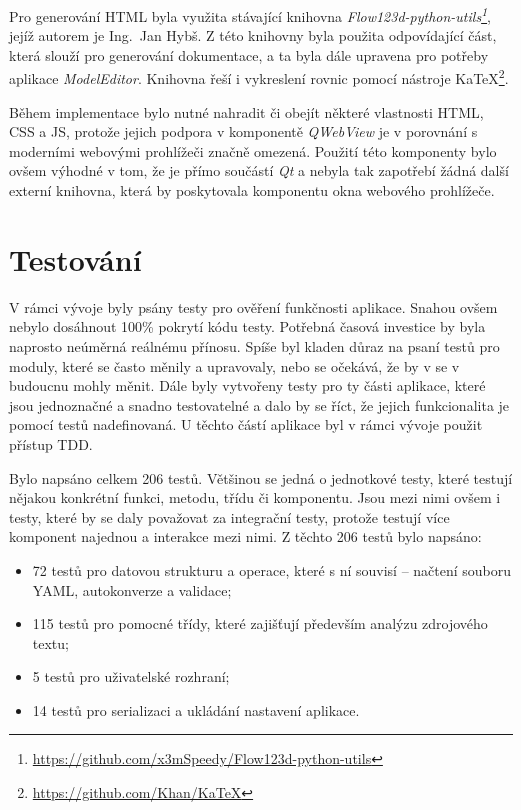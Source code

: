 \documentclass[FM,bw,DP]{tulthesis}
\begin{document}
Pro generování HTML byla využita stávající knihovna \textit{Flow123d-python-utils\footnote{\url{https://github.com/x3mSpeedy/Flow123d-python-utils}}}, jejíž autorem je Ing.~Jan Hybš. Z této knihovny byla použita odpovídající část, která slouží pro generování dokumentace, a ta byla dále upravena pro potřeby aplikace \textit{ModelEditor}. Knihovna řeší i vykreslení rovnic pomocí nástroje KaTeX\footnote{\url{https://github.com/Khan/KaTeX}}.

Během implementace bylo nutné nahradit či obejít některé vlastnosti \gls{HTML}, \gls{CSS} a \gls{JS}, protože jejich podpora v komponentě \textit{QWebView} je v porovnání s moderními webovými prohlížeči značně omezená. Použití této komponenty bylo ovšem výhodné v tom, že je přímo součástí \textit{Qt} a nebyla tak zapotřebí žádná další externí knihovna, která by poskytovala komponentu okna webového prohlížeče.

\section{Testování}

V rámci vývoje byly psány testy pro ověření funkčnosti aplikace. Snahou ovšem nebylo dosáhnout 100\% pokrytí kódu testy. Potřebná časová investice by byla naprosto neúměrná reálnému přínosu. Spíše byl kladen důraz na psaní testů pro moduly, které se často měnily a upravovaly, nebo se očekává, že by v se v budoucnu mohly měnit. Dále byly vytvořeny testy pro ty části aplikace, které jsou jednoznačné a snadno testovatelné a dalo by se říct, že jejich funkcionalita je pomocí testů nadefinovaná. U těchto částí aplikace byl v rámci vývoje použit přístup \gls{TDD}.

Bylo napsáno celkem 206 testů. Většinou se jedná o jednotkové testy, které testují nějakou konkrétní funkci, metodu, třídu či komponentu. Jsou mezi nimi ovšem i testy, které by se daly považovat za integrační testy, protože testují více komponent najednou a interakce mezi nimi. Z těchto 206 testů bylo napsáno:

\begin{itemize}
\item 72 testů pro datovou strukturu a operace, které s ní souvisí -- načtení souboru \gls{YAML}, autokonverze a validace;
\item 115 testů pro pomocné třídy, které zajišťují především analýzu zdrojového textu;
\item 5 testů pro uživatelské rozhraní;
\item 14 testů pro serializaci a ukládání nastavení aplikace.
\end{itemize}
\end{document}
